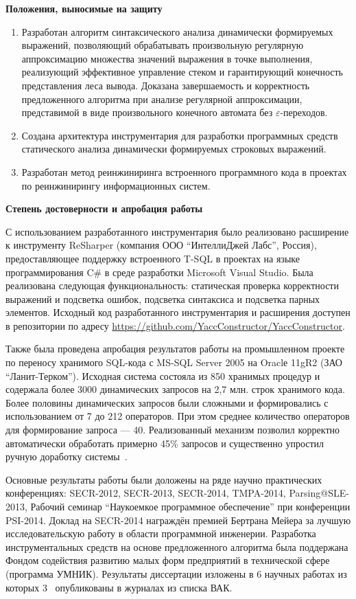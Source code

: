\textbf{Положения, выносимые на защиту}
\begin{enumerate}
    \item Разработан алгоритм синтаксического анализа динамически формируемых выражений, позволяющий обрабатывать произвольную регулярную аппроксимацию множества значений выражения в точке выполнения, реализующий 
    эффективное управление стеком и гарантирующий конечность представления леса вывода. Доказана завершаемость и корректность предложенного алгоритма при анализе регулярной аппроксимации, представимой в виде произвольного конечного автомата без $\varepsilon$-переходов.
    \item Создана архитектура инструментария для разработки программных средств статического анализа динамически формируемых строковых выражений.
    \item Разработан метод реинжиниринга встроенного программного кода в проектах по реинжинирингу информационных систем. 
\end{enumerate}

\textbf{Степень достоверности и апробация работы}

С использованием разработанного инструментария было реализовано расширение к инструменту ReSharper (компания ООО ``ИнтеллиДжей Лабс'', Россия), предоставляющее поддержку встроенного T-SQL в проектах на языке программирования C\# в среде разработки Microsoft Visual Studio. Была реализована следующая функциональность: статическая проверка корректности выражений и подсветка ошибок, подсветка синтаксиса и подсветка парных элементов. Исходный код разработанного инструментария и расширения доступен в репозитории по адресу \url{https://github.com/YaccConstructor/YaccConstructor}.

Также была проведена апробация результатов работы на промышленном проекте по переносу хранимого SQL-кода с MS-SQL Server 2005 на Oraclе 11gR2 (ЗАО ``Ланит-Терком''). Исходная система состояла из 850 хранимых процедур и содержала более 3000 динамических запросов на 2,7 млн. строк хранимого кода. Более половины динамических запросов были сложными и формировались с использованием от 7 до 212 операторов. При этом среднее количество операторов для формирование запроса --- 40. Реализованный механизм позволил корректно автоматически обработать примерно 45\% запросов и существенно упростил ручную доработку системы~\cite{Syrcose}.

Основные результаты работы были доложены на ряде научно практических конференциях: SECR-2012, SECR-2013, SECR-2014, TMPA-2014, Parsing@SLE-2013, Рабочий семинар ``Наукоемкое программное обеспечение'' при конференции PSI-2014. Доклад на SECR-2014 награждён премией Бертрана Мейера за лучшую исследовательскую работу в области программной инженерии. Разработка инструментальных средств на основе предложенного алгоритма была поддержана Фондом содействия развитию малых форм предприятий в технической сфере (программа УМНИК). Результаты диссертации изложены в 6 научных работах из которых 3~\cite{YCArticle,SELforIDEru,AbstractGLL} опубликованы в журналах из списка ВАК.%

